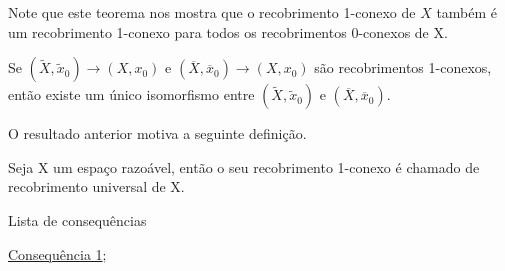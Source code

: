 Note que este teorema nos mostra que o recobrimento 1-conexo de $X$ também é um recobrimento 1-conexo para todos os recobrimentos 0-conexos de X.

\begin{corol}
    Se $(\tilde X, \tilde x_0) \longrightarrow (X, x_0)$ e $(\overline{X}, \overline{x}_0) \longrightarrow (X, x_0)$ são recobrimentos 1-conexos, então existe um único isomorfismo entre $(\tilde X, \tilde x_0)$ e $(\overline{X}, \overline{x}_0)$.
\end{corol}

O resultado anterior motiva a seguinte definição.

\begin{defi}
    Seja X um espaço razoável, então o seu recobrimento 1-conexo é chamado de recobrimento universal de X.
\end{defi}

\begin{titlemize}{Lista de consequências}
	\item \hyperref[consequencia1]{Consequência 1};\\
	\item \hyperref[]{}
\end{titlemize}